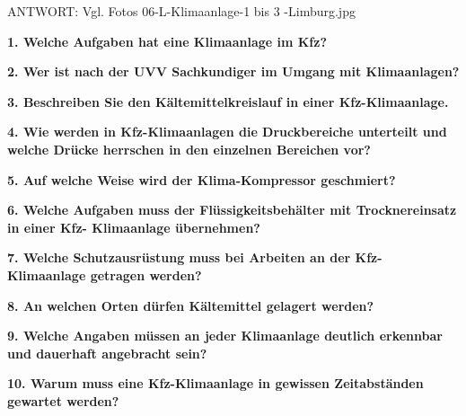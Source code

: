 ANTWORT: Vgl. Fotos 06-L-Klimaanlage-1 bis 3 -Limburg.jpg

\textbf{1. Welche Aufgaben hat eine Klimaanlage im Kfz?}

\textbf{2. Wer ist nach der UVV Sachkundiger im Umgang mit
Klimaanlagen?}

\textbf{3. Beschreiben Sie den Kältemittelkreislauf in einer
Kfz-Klimaanlage.}

\textbf{4. Wie werden in Kfz-Klimaanlagen die Druckbereiche unterteilt
und welche Drücke herrschen in den einzelnen Bereichen vor?}

\textbf{5. Auf welche Weise wird der Klima-Kompressor geschmiert?}

\textbf{6. Welche Aufgaben muss der Flüssigkeitsbehälter mit
Trocknereinsatz in einer Kfz- Klimaanlage übernehmen?}

\textbf{7. Welche Schutzausrüstung muss bei Arbeiten an der
Kfz-Klimaanlage getragen werden?}

\textbf{8. An welchen Orten dürfen Kältemittel gelagert werden?}

\textbf{9. Welche Angaben müssen an jeder Klimaanlage deutlich erkennbar
und dauerhaft angebracht sein?}

\textbf{10. Warum muss eine Kfz-Klimaanlage in gewissen Zeitabständen
gewartet werden?}
